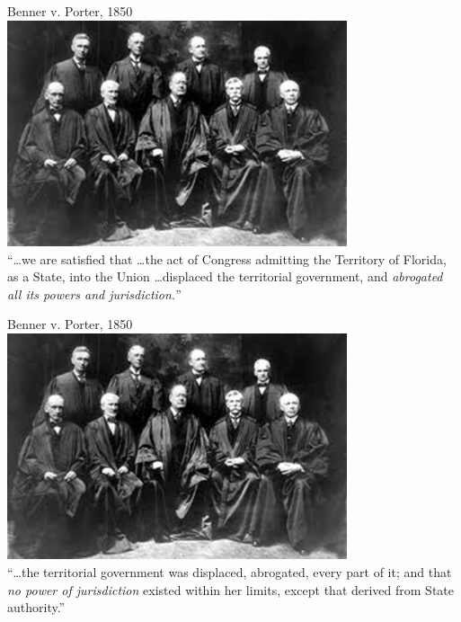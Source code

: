\begin{frame}{Benner v. Porter, 1850}
    \centering
    \includegraphics[width=0.75\textwidth]{img/sc-1905.png} \\
    ``\ldots we are satisfied that \ldots the act of Congress admitting the Territory of Florida, as a State, into the Union \ldots displaced the territorial government, and \emph{abrogated all its powers and jurisdiction.}''
\end{frame}

\begin{frame}{Benner v. Porter, 1850}
    \centering
    \includegraphics[width=0.75\textwidth]{img/sc-1905.png} \\
    ``\ldots the territorial government was displaced, abrogated, every part of it; and that \emph{no power of jurisdiction} existed within her limits, except that derived from State authority.''
\end{frame}

